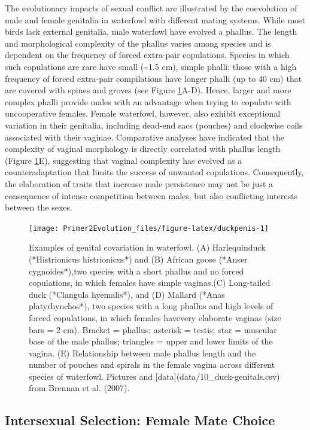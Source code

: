 \documentclass[
]{book}
\begin{document}
The evolutionary impacts of sexual conflict are illustrated by the coevolution of male and female genitalia in waterfowl with different mating systems. While most birds lack external genitalia, male waterfowl have evolved a phallus. The length and morphological complexity of the phallus varies among species and is dependent on the frequency of forced extra-pair copulations. Species in which such copulations are rare have small (\textasciitilde1.5 cm), simple phalli; those with a high frequency of forced extra-pair compilations have longer phalli (up to 40 cm) that are covered with spines and groves (see Figure \ref{fig:duckpenis}A-D). Hence, larger and more complex phalli provide males with an advantage when trying to copulate with uncooperative females. Female waterfowl, however, also exhibit exceptional variation in their genitalia, including dead-end sacs (pouches) and clockwise coils associated with their vaginae. Comparative analyses have indicated that the complexity of vaginal morphology is directly correlated with phallus length (Figure \ref{fig:duckpenis}E), suggesting that vaginal complexity has evolved as a counteradaptation that limits the success of unwanted copulations. Consequently, the elaboration of traits that increase male persistence may not be just a consequence of intense competition between males, but also conflicting interests between the sexes.

\begin{figure}
\texttt{[image: Primer2Evolution\_files/figure-latex/duckpenis-1]} \caption{Examples of genital covariation in waterfowl. (A) Harlequinduck (*Histrionicus histrionicus*) and (B) African goose (*Anser cygnoides*),two species with a short phallus and no forced copulations, in which females have simple vaginas.(C) Long-tailed duck (*Clangula hyemalis*), and (D) Mallard (*Anas platyrhynchos*), two species with a long phallus and high levels of forced copulations, in which females havevery elaborate vaginas (size bars = 2 cm). Bracket = phallus; asterisk = testis; star = muscular base of the male phallus; triangles = upper and lower limits of the vagina. (E) Relationship between male phallus length and the number of pouches and spirals in the female vagina across different species of waterfowl. Pictures and [data](data/10_duck-genitals.csv) from Brennan et al. (2007).}\label{fig:duckpenis}
\end{figure}

\hypertarget{intersexual-selection-female-mate-choice}{%
\subsection{Intersexual Selection: Female Mate Choice}\label{intersexual-selection-female-mate-choice}}
\end{document}
